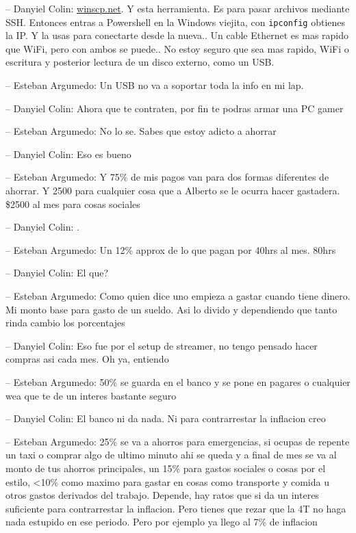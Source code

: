 -- Danyiel Colin: \href{https://winscp.net/eng/index.php}{winscp.net}. Y
esta herramienta. Es para pasar archivos mediante SSH. Entonces entras a
Powershell en la Windows viejita, con \texttt{ipconfig} obtienes la IP.
Y la usas para conectarte desde la nueva.. Un cable Ethernet es mas
rapido que WiFi, pero con ambos se puede.. No estoy seguro que sea mas
rapido, WiFi o escritura y posterior lectura de un disco externo, como
un USB.

-- Esteban Argumedo: Un USB no va a soportar toda la info en mi lap.

-- Danyiel Colin: Ahora que te contraten, por fin te podras armar una PC
gamer

-- Esteban Argumedo: No lo se. Sabes que estoy adicto a ahorrar

-- Danyiel Colin: Eso es bueno

-- Esteban Argumedo: Y 75\% de mis pagos van para dos formas diferentes
de ahorrar. Y 2500 para cualquier cosa que a Alberto se le ocurra hacer
gastadera. \$2500 al mes para cosas sociales

-- Danyiel Colin: .

-- Esteban Argumedo: Un 12\% approx de lo que pagan por 40hrs al mes.
80hrs

-- Danyiel Colin: El que?

-- Esteban Argumedo: Como quien dice uno empieza a gastar cuando tiene
dinero. Mi monto base para gasto de un sueldo. Asi lo divido y
dependiendo que tanto rinda cambio los porcentajes

-- Danyiel Colin: Eso fue por el setup de streamer, no tengo pensado
hacer compras asi cada mes. Oh ya, entiendo

-- Esteban Argumedo: 50\% se guarda en el banco y se pone en pagares o
cualquier wea que te de un interes bastante seguro

-- Danyiel Colin: El banco ni da nada. Ni para contrarrestar la
inflacion creo

-- Esteban Argumedo: 25\% se va a ahorros para emergencias, si ocupas de
repente un taxi o comprar algo de ultimo minuto ahi se queda y a final
de mes se va al monto de tus ahorros principales, un 15\% para gastos
sociales o cosas por el estilo, \textless10\% como maximo para gastar en
cosas como transporte y comida u otros gastos derivados del trabajo.
Depende, hay ratos que si da un interes suficiente para contrarrestar la
inflacion. Pero tienes que rezar que la 4T no haga nada estupido en ese
periodo. Pero por ejemplo ya llego al 7\% de inflacion

